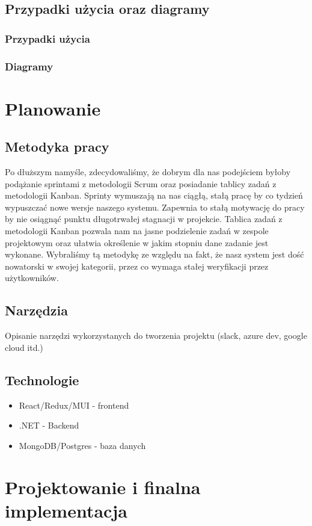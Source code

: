 \documentclass[a4paper,11pt]{report}
\begin{document}
\section{Przypadki użycia oraz diagramy}
\subsection{Przypadki użycia}
\subsection{Diagramy}
\chapter {Planowanie}
\section{Metodyka pracy}
Po dłuższym namyśle, zdecydowaliśmy, że dobrym dla nas podejściem byłoby podążanie sprintami z metodologii Scrum oraz posiadanie tablicy zadań z metodologii Kanban\cite{agile}.  Sprinty wymuszają na nas ciągłą, stałą pracę by co tydzień wypuszczać nowe wersje naszego systemu. Zapewnia to stałą motywację do pracy by nie osiągnąć punktu długotrwałej stagnacji w projekcie. Tablica zadań z metodologii Kanban pozwala nam na jasne podzielenie zadań w zespole projektowym oraz ułatwia określenie w jakim stopniu dane zadanie jest wykonane. Wybraliśmy tą metodykę ze względu na fakt, że nasz system jest dość nowatorski w swojej kategorii, przez co wymaga stałej weryfikacji przez użytkowników.
\section{Narzędzia}
Opisanie narzędzi wykorzystanych do tworzenia projektu (slack, azure dev, google cloud itd.)
\section{Technologie}
		\begin{itemize}
			\item React/Redux/MUI - frontend
			\item .NET - Backend
			\item MongoDB/Postgres - baza danych
		\end{itemize}

\chapter {Projektowanie i finalna implementacja}
\end{document}
